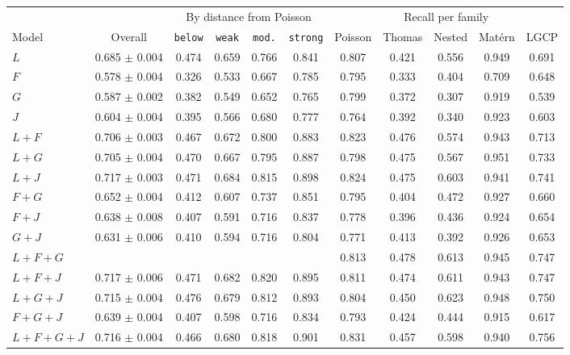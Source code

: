 \begin{table}[ht]
\centering\footnotesize
\begin{tabular}{@{}l c cccc ccccc@{}}
\toprule
 & & \multicolumn{4}{c}{By distance from Poisson} & \multicolumn{5}{c}{Recall per family}\\
\cmidrule(lr){3-6}\cmidrule(l){7-11}
Model & Overall & \texttt{below} & \texttt{weak} & \texttt{mod.} & \texttt{strong} & Poisson & Thomas & Nested & Mat\'ern & LGCP\\
\midrule
$L$ & 0.685 $\pm$ 0.004 & 0.474 & 0.659 & 0.766 & 0.841 & 0.807 & 0.421 & 0.556 & 0.949 & 0.691\\
$F$ & 0.578 $\pm$ 0.004 & 0.326 & 0.533 & 0.667 & 0.785 & 0.795 & 0.333 & 0.404 & 0.709 & 0.648\\
$G$ & 0.587 $\pm$ 0.002 & 0.382 & 0.549 & 0.652 & 0.765 & 0.799 & 0.372 & 0.307 & 0.919 & 0.539\\
$J$ & 0.604 $\pm$ 0.004 & 0.395 & 0.566 & 0.680 & 0.777 & 0.764 & 0.392 & 0.340 & 0.923 & 0.603\\
$L{+}F$ & 0.706 $\pm$ 0.003 & 0.467 & 0.672 & 0.800 & 0.883 & 0.823 & 0.476 & 0.574 & 0.943 & 0.713\\
$L{+}G$ & 0.705 $\pm$ 0.004 & 0.470 & 0.667 & 0.795 & 0.887 & 0.798 & 0.475 & 0.567 & 0.951 & 0.733\\
$L{+}J$ & 0.717 $\pm$ 0.003 & 0.471 & 0.684 & 0.815 & 0.898 & 0.824 & 0.475 & 0.603 & 0.941 & 0.741\\
$F{+}G$ & 0.652 $\pm$ 0.004 & 0.412 & 0.607 & 0.737 & 0.851 & 0.795 & 0.404 & 0.472 & 0.927 & 0.660\\
$F{+}J$ & 0.638 $\pm$ 0.008 & 0.407 & 0.591 & 0.716 & 0.837 & 0.778 & 0.396 & 0.436 & 0.924 & 0.654\\
$G{+}J$ & 0.631 $\pm$ 0.006 & 0.410 & 0.594 & 0.716 & 0.804 & 0.771 & 0.413 & 0.392 & 0.926 & 0.653\\
$L{+}F{+}G$ & \B{0.719 $\pm$ 0.003} & \B{0.473} & \B{0.684} & \B{0.819} & \B{0.899} & 0.813 & 0.478 & 0.613 & 0.945 & 0.747\\
$L{+}F{+}J$ & 0.717 $\pm$ 0.006 & 0.471 & 0.682 & 0.820 & 0.895 & 0.811 & 0.474 & 0.611 & 0.943 & 0.747\\
$L{+}G{+}J$ & 0.715 $\pm$ 0.004 & 0.476 & 0.679 & 0.812 & 0.893 & 0.804 & 0.450 & 0.623 & 0.948 & 0.750\\
$F{+}G{+}J$ & 0.639 $\pm$ 0.004 & 0.407 & 0.598 & 0.716 & 0.834 & 0.793 & 0.424 & 0.444 & 0.915 & 0.617\\
$L{+}F{+}G{+}J$ & 0.716 $\pm$ 0.004 & 0.466 & 0.680 & 0.818 & 0.901 & 0.831 & 0.457 & 0.598 & 0.940 & 0.756\\

\end{tabular}
\end{table}
